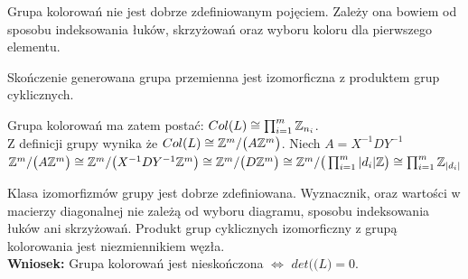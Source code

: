 Grupa kolorowań nie jest dobrze zdefiniowanym pojęciem. Zależy ona bowiem od sposobu indeksowania łuków, skrzyżowań oraz wyboru koloru dla pierwszego elementu. 

\begin{twierdzenie}
Skończenie generowana grupa przemienna jest izomorficzna z produktem grup cyklicznych.
\end{twierdzenie}
Grupa kolorowań ma zatem postać: $Col(L) \cong \prod_{i=1}^m \mathbb Z_{n_{i}}$. \\
Z definicji grupy wynika że $Col(L) \cong \mathbb Z^m/\big(A\mathbb Z^m\big)$. Niech $A=X^{-1}DY^{-1}$ \\
$\mathbb Z^m/\big(A\mathbb Z^m\big) \cong \mathbb Z^m/\big(X^{-1}DY^{-1}\mathbb Z^m\big)  \cong \mathbb Z^m/\big(D\mathbb Z^m\big) \cong \mathbb Z^m/\big(\prod_{i=1}^m \vert d_{i} \vert \mathbb Z\big) \cong \prod_{i=1}^m \mathbb Z_{\vert d_{i} \vert}$ 

Klasa izomorfizmów grupy jest dobrze zdefiniowana. Wyznacznik, oraz wartości w macierzy diagonalnej nie zależą od wyboru diagramu, sposobu indeksowania łuków ani skrzyżowań. Produkt grup cyklicznych izomorficzny z grupą kolorowania jest niezmiennikiem węzła. \\
\textbf{Wniosek:} Grupa kolorowań jest nieskończona $\Leftrightarrow$ $det(\big(L\big) = 0$.


